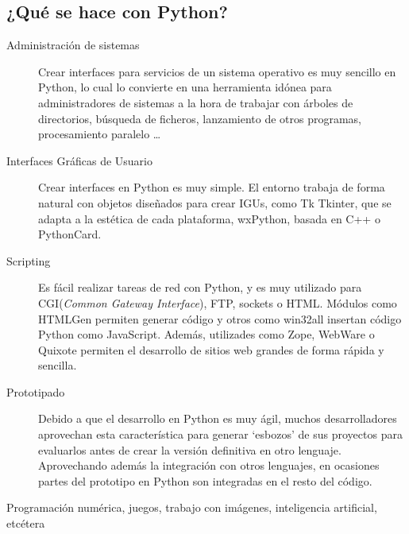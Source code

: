 \documentclass[12pt]{article} %
\begin{document}
\subsection{¿Qué se hace con Python?}
\begin{description}
	\item[Administración de sistemas]
	Crear interfaces para servicios de un sistema operativo es muy sencillo en Python, lo cual lo convierte en una herramienta idónea para administradores de sistemas a la hora de trabajar con árboles de directorios, búsqueda de ficheros, lanzamiento de otros programas, procesamiento paralelo \dots
	\item[Interfaces Gráficas de Usuario]
	Crear interfaces en Python es muy simple. El entorno trabaja de forma natural con objetos diseñados para crear IGUs, como Tk Tkinter, que se adapta a la estética de cada plataforma, wxPython, basada en C++ o PythonCard.
	\item[Scripting]
	Es fácil realizar tareas de red con Python, y es muy utilizado para CGI(\textit{Common Gateway Interface}), FTP, sockets o HTML. Módulos como HTMLGen permiten generar código y otros como win32all insertan código Python como JavaScript. Además, utilizades como Zope, WebWare o Quixote permiten el desarrollo de sitios web grandes de forma rápida y sencilla.
	\item[Prototipado]
	Debido a que el desarrollo en Python es muy ágil, muchos desarrolladores aprovechan esta característica para generar `esbozos' de sus proyectos para evaluarlos antes de crear la versión definitiva en otro lenguaje. Aprovechando además la integración con otros lenguajes, en ocasiones partes del prototipo en Python son integradas en el resto del código.
	\item[Programación numérica, juegos, trabajo con imágenes, inteligencia artificial, etcétera]
\end{description}
\end{document}
